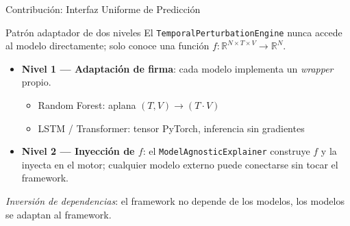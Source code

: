 \documentclass{beamer}
\begin{document}
\begin{frame}{Contribución: Interfaz Uniforme de Predicción}
    \begin{block}{Patrón adaptador de dos niveles}
        El \texttt{TemporalPerturbationEngine} nunca accede al modelo
        directamente; solo conoce una función
        $f: \mathbb{R}^{N\times T\times V}\to\mathbb{R}^N$.
    \end{block}
    \begin{itemize}
        \item \textbf{Nivel 1 — Adaptación de firma}: cada modelo
        implementa un \emph{wrapper} propio.
        \begin{itemize}
            \small
            \item Random Forest: aplana $(T,V)\to(T{\cdot}V)$
            \item LSTM / Transformer: tensor PyTorch, inferencia sin
            gradientes
        \end{itemize}
        \item \textbf{Nivel 2 — Inyección de $f$}: el
        \texttt{ModelAgnosticExplainer} construye $f$ y la inyecta en
        el motor; cualquier modelo externo puede conectarse sin tocar
        el framework.
    \end{itemize}
    \vspace{0.2cm}
    \begin{center}
        \textit{Inversión de dependencias}: el framework no depende
        de los modelos, los modelos se adaptan al framework.
    \end{center}
\end{frame}
\end{document}
